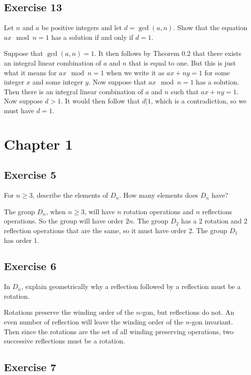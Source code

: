 \documentclass[12pt]{article}
\begin{document}
\subsection*{Exercise 13}

Let $n$ and $a$ be positive integers and let $d=\gcd(a,n)$.  Show that the
equation $ax\mod n=1$ has a solution if and only if $d=1$.

Suppose that $\gcd(a,n)=1$.  It then follows by Theorem 0.2 that
there exists an integral linear combination of $a$ and $n$ that is
equal to one.  But this is just what it means for $ax\mod n=1$ when
we write it as $ax+ny=1$ for some integer $x$ and some integer $y$.
Now suppose that $ax\mod n=1$ has a solution.  Then there is an
integral linear combination of $a$ and $n$ such that $ax+ny=1$.  Now
suppose $d>1$.  It would then follow that $d|1$, which is a contradiction,
so we must have $d=1$.

\section*{Chapter 1}

\subsection*{Exercise 5}

For $n\geq 3$, describe the elements of $D_n$.  How many elements does $D_n$ have?

The group $D_n$, when $n\geq 3$, will have $n$ rotation operations and $n$ reflections operations.
So the group will have order $2n$.  The group $D_2$ has a 2 rotation and 2 reflection operations that
are the same, so it must have order 2.  The group $D_1$ has order 1.

\subsection*{Exercise 6}

In $D_n$, explain geometrically why a reflection followed by a reflection must be a rotation.

Rotations preserve the winding order of the $n$-gon, but reflections do not.  An even
number of reflection will leave the winding order of the $n$-gon invariant.  Then since the
rotations are the set of all winding preserving operations, two successive reflections
must be a rotation.

\subsection*{Exercise 7}
\end{document}
